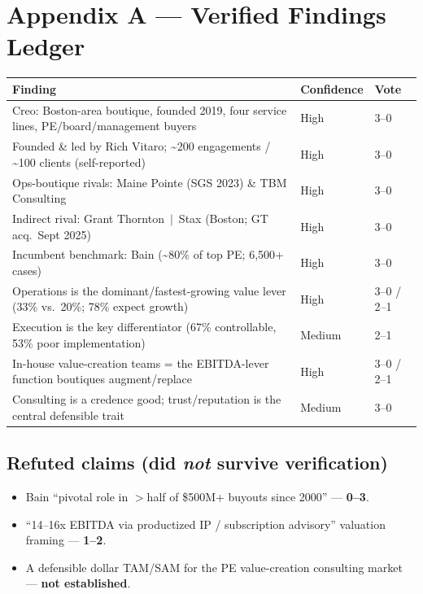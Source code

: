 \documentclass[11pt]{article}
\begin{document}
\section{Appendix A --- Verified Findings Ledger}
\begin{center}
\renewcommand{\arraystretch}{1.25}
\small
\begin{longtable}{p{8.8cm} p{1.8cm} p{1.5cm}}
\toprule
\textbf{Finding} & \textbf{Confidence} & \textbf{Vote} \\
\midrule
\endhead
Creo: Boston-area boutique, founded 2019, four service lines, PE/board/management buyers & High & 3--0 \\
Founded \& led by Rich Vitaro; \textasciitilde{}200 engagements / \textasciitilde{}100 clients (self-reported) & High & 3--0 \\
Ops-boutique rivals: Maine Pointe (SGS 2023) \& TBM Consulting & High & 3--0 \\
Indirect rival: Grant Thornton~$\vert$~Stax (Boston; GT acq.\ Sept 2025) & High & 3--0 \\
Incumbent benchmark: Bain (\textasciitilde{}80\% of top PE; 6,500+ cases) & High & 3--0 \\
Operations is the dominant/fastest-growing value lever (33\% vs.\ 20\%; 78\% expect growth) & High & 3--0 / 2--1 \\
Execution is the key differentiator (67\% controllable, 53\% poor implementation) & Medium & 2--1 \\
In-house value-creation teams = the EBITDA-lever function boutiques augment/replace & High & 3--0 / 2--1 \\
Consulting is a credence good; trust/reputation is the central defensible trait & Medium & 3--0 \\
\bottomrule
\end{longtable}
\end{center}

\subsection*{Refuted claims (did \emph{not} survive verification)}
\begin{itemize}
  \item Bain ``pivotal role in $>$half of \$500M+ buyouts since 2000'' --- \textbf{0--3}.
  \item ``14--16x EBITDA via productized IP / subscription advisory'' valuation framing --- \textbf{1--2}.
  \item A defensible dollar TAM/SAM for the PE value-creation consulting market --- \textbf{not established}.
\end{itemize}
\end{document}
